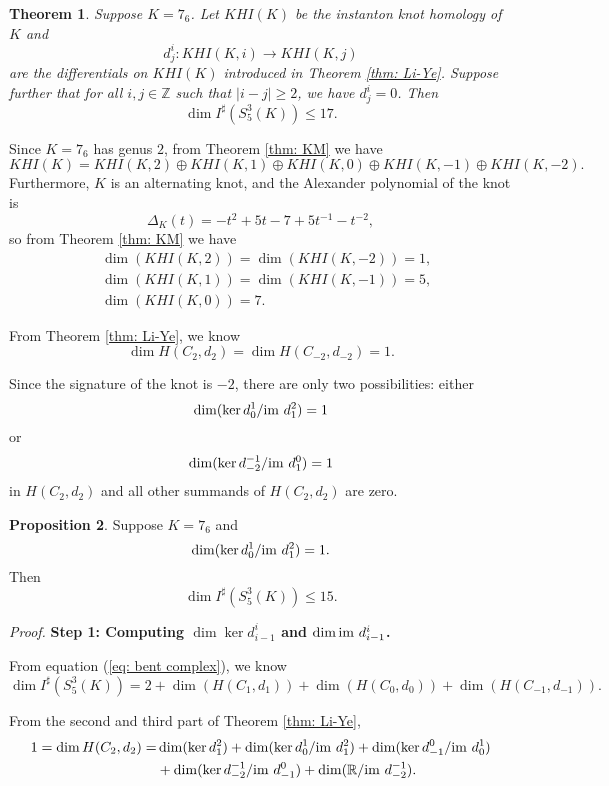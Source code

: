 \documentclass{amsart}
\newtheorem{thm}{Theorem}[section]
\theoremstyle{definition}
\newtheorem{prop}[thm]{Proposition}
\newcommand{\im}{{\rm im~}}
\begin{document}
\begin{thm}
	Suppose $K=7_6$. Let $KHI(K)$ be the instanton knot homology of $K$ and
	$$d^i_j: KHI(K,i)\rightarrow KHI(K,j)$$
	are the differentials on $KHI(K)$ introduced in Theorem \ref{thm: Li-Ye}. Suppose further that for all $i,j\in\mathbb{Z}$ such that $|i-j|\geq 2$, we have $d^i_j=0$. Then 
	\[\dim I^{\sharp}(S^3_{5}(K))\leq 17.\]
\end{thm}


\bigskip

Since $K=7_6$ has genus $2$, from Theorem \ref{thm: KM} we have
$$ KHI(K) = KHI(K,2)\oplus KHI(K,1)\oplus KHI(K,0)\oplus KHI(K,-1)\oplus KHI(K,-2).$$
Furthermore, $K$ is an alternating knot, and the Alexander polynomial of the knot is
\[\Delta_{K}(t)=-t^2+5t-7+5t^{-1}-t^{-2},\]
so from Theorem \ref{thm: KM} we have
\begin{equation*}
    \begin{aligned}
        &\dim(KHI (K, 2))=\dim(KHI (K, -2))= 1,\\
        &\dim(KHI (K,1))=\dim(KHI (K,-1))= 5,\\
        &\dim(KHI (K, 0))= 7.
    \end{aligned}
\end{equation*}

From Theorem \ref{thm: Li-Ye}, we know
$$\dim H(C_2,d_2)=\dim H(C_{-2},d_{-2})=1.$$

Since the signature of the knot is $-2$, there are only two possibilities:
either
$$\dim (\ker d^1_0\slash \im d^2_1)=1$$
or
$$\dim (\ker d^{-1}_{-2}\slash\im d^0_1)=1$$ 
in $H(C_2,d_2)$ and all other summands of $H(C_2,d_2)$ are zero.





\begin{prop}
Suppose $K=7_6$ and
$$\dim (\ker d^1_0\slash \im d^2_1)=1.$$
Then
$$\dim I^{\sharp}(S^3_{5}(K))\leq 15.$$
\end{prop}

\textit{Proof.}
\textbf{Step 1: Computing $\dim \ker d^i_{i-1}$ and $\dim \im d^i_{i-1}$. }

From equation (\ref{eq: bent complex}), we know
$$\dim I^{\sharp}(S^3_{5}(K))= 2+\dim(H(C_1,d_1))+\dim(H(C_0,d_0))+\dim(H(C_{-1},d_{-1})).$$

From the second and third part of Theorem \ref{thm: Li-Ye},
\begin{equation}
    \begin{aligned}
        1=\dim H(C_2,d_2)=&\dim (\ker d^2_1)+ \dim (\ker d^1_0\slash \im d^2_1) + \dim(\ker d^0_{-1}/ \im d^1_0)\\
        &+\dim (\ker d^{-1}_{-2}/ \im d^0_{-1})+\dim (\mathbb{R}/\im d^{-1}_{-2}).
    \end{aligned}
\end{equation}
\end{document}
